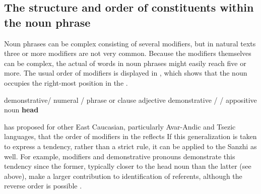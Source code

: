 
\subsection{The structure and order of constituents within the noun phrase}
\label{ssec:The structure and order of constituents within the noun phrase}

Noun phrases can be complex consisting of several modifiers, but in natural texts three or more modifiers are not very common. Because the modifiers themselves can be complex, the actual  of words in noun phrases might easily reach five or more. The usual order of modifiers is displayed in , which shows that the noun occupies the right-most position in the .

\begin{exe}
	\ex	 demonstrative\slash {}	\newline\hspace*{1.5em}	numeral / 	\newline\hspace*{3.0em}	phrase or clause	\newline\hspace*{4.5em}	adjective	\newline\hspace*{6.0em}	demonstrative /  / 	\newline\hspace*{7.5em}	appositive noun	\newline\hspace*{9.0em}	\textbf{head} 	\label{ex:Modifiers and their order in the NP}
\end{exe}

\citet[654]{Testelec1998a} has proposed for other East Caucasian, particularly Avar-Andic and Tsezic languages, that the order of modifiers in the  reflects  If this generalization is taken to express a tendency, rather than a strict rule, it can be applied to the Sanzhi  as well. For example,  modifiers and demonstrative pronouns demonstrate this tendency since the former, typically closer to the head noun than the latter (see  above), make a larger contribution to identification of referents, although the reverse order is possible .\largerpage[2]

